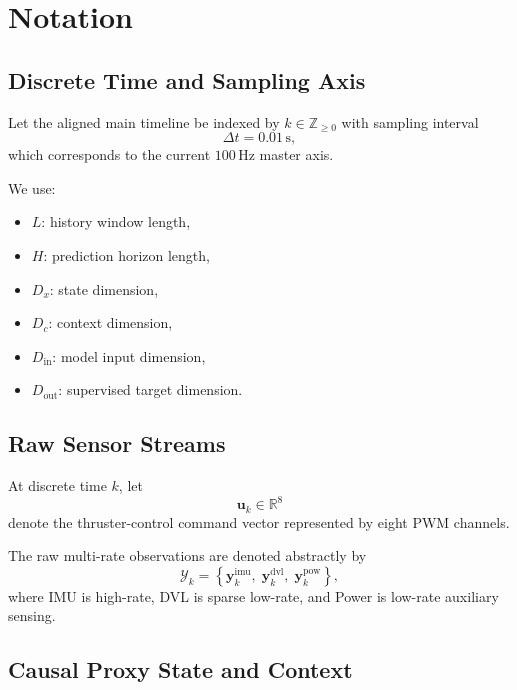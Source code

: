 \section{Notation}

\subsection{Discrete Time and Sampling Axis}

Let the aligned main timeline be indexed by $k \in \mathbb{Z}_{\ge 0}$ with sampling interval
\begin{equation}
\Delta t = 0.01\,\mathrm{s},
\end{equation}
which corresponds to the current $100\,\mathrm{Hz}$ master axis.

We use:
\begin{itemize}
  \item $L$: history window length,
  \item $H$: prediction horizon length,
  \item $D_x$: state dimension,
  \item $D_c$: context dimension,
  \item $D_{\mathrm{in}}$: model input dimension,
  \item $D_{\mathrm{out}}$: supervised target dimension.
\end{itemize}

\subsection{Raw Sensor Streams}

At discrete time $k$, let
\begin{equation}
\mathbf{u}_k \in \mathbb{R}^{8}
\end{equation}
denote the thruster-control command vector represented by eight PWM channels.

The raw multi-rate observations are denoted abstractly by
\begin{equation}
\mathcal{Y}_k =
\left\{
\mathbf{y}^{\mathrm{imu}}_k,\;
\mathbf{y}^{\mathrm{dvl}}_k,\;
\mathbf{y}^{\mathrm{pow}}_k
\right\},
\end{equation}
where IMU is high-rate, DVL is sparse low-rate, and Power is low-rate auxiliary sensing.

\subsection{Causal Proxy State and Context}


